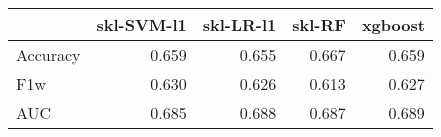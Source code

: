 \begin{tabular}{lrrrr}
\toprule
{} &  skl-SVM-l1 &  skl-LR-l1 &  skl-RF &  xgboost \\
\midrule
Accuracy &       0.659 &      0.655 &   0.667 &    0.659 \\
F1w      &       0.630 &      0.626 &   0.613 &    0.627 \\
AUC      &       0.685 &      0.688 &   0.687 &    0.689 \\
\bottomrule
\end{tabular}
